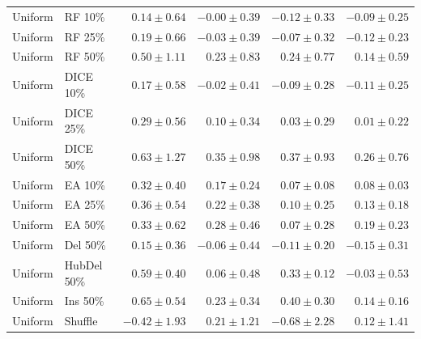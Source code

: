 {\begin{longtable}{llrrrr}
Uniform & RF 10\% & $0.14\pm0.64$ & $-0.00\pm0.39$ & $-0.12\pm0.33$ & $-0.09\pm0.25$ \\
Uniform & RF 25\% & $0.19\pm0.66$ & $-0.03\pm0.39$ & $-0.07\pm0.32$ & $-0.12\pm0.23$ \\
Uniform & RF 50\% & $0.50\pm1.11$ & $0.23\pm0.83$ & $0.24\pm0.77$ & $0.14\pm0.59$ \\
Uniform & DICE 10\% & $0.17\pm0.58$ & $-0.02\pm0.41$ & $-0.09\pm0.28$ & $-0.11\pm0.25$ \\
Uniform & DICE 25\% & $0.29\pm0.56$ & $0.10\pm0.34$ & $0.03\pm0.29$ & $0.01\pm0.22$ \\
Uniform & DICE 50\% & $0.63\pm1.27$ & $0.35\pm0.98$ & $0.37\pm0.93$ & $0.26\pm0.76$ \\
Uniform & EA 10\% & $0.32\pm0.40$ & $0.17\pm0.24$ & $0.07\pm0.08$ & $0.08\pm0.03$ \\
Uniform & EA 25\% & $0.36\pm0.54$ & $0.22\pm0.38$ & $0.10\pm0.25$ & $0.13\pm0.18$ \\
Uniform & EA 50\% & $0.33\pm0.62$ & $0.28\pm0.46$ & $0.07\pm0.28$ & $0.19\pm0.23$ \\
Uniform & Del 50\% & $0.15\pm0.36$ & $-0.06\pm0.44$ & $-0.11\pm0.20$ & $-0.15\pm0.31$ \\
Uniform & HubDel 50\% & $0.59\pm0.40$ & $0.06\pm0.48$ & $0.33\pm0.12$ & $-0.03\pm0.53$ \\
Uniform & Ins 50\% & $0.65\pm0.54$ & $0.23\pm0.34$ & $0.40\pm0.30$ & $0.14\pm0.16$ \\
Uniform & Shuffle & $-0.42\pm1.93$ & $0.21\pm1.21$ & $-0.68\pm2.28$ & $0.12\pm1.41$ \\
\end{longtable}
}

